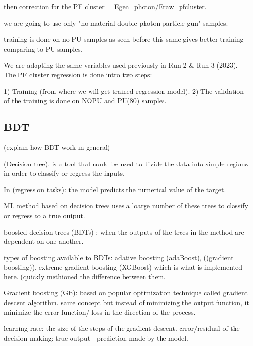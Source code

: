 then correction for the PF cluster = Egen_photon/Eraw_pfcluster.

we are going to use only "no material double photon particle gun" samples.


training is done on no PU samples as seen before this same gives better training comparing to PU samples. 


We are adopting the same variables used previously in Run 2 & Run 3 (2023). The PF cluster regression is done intro two steps:

1) Training (from where we will get trained regression model).
2) The validation of the training is done on NOPU and PU(80) samples.


\subsection{BDT}
(explain how BDT work in general)

(Decision tree): is a tool that could be used to divide the data into simple regions in order to classify or regress the inputs.

In (regression tasks): the model predicts the numerical value of the target.

ML method based on decision trees uses a loarge number of these trees to classify or regress to a true output.

boosted decision trees (BDTs) : when the outputs of the trees in the method are dependent on one another.

types of boosting available to BDTs: adative boosting (adaBoost), ((gradient boosting)), extreme gradient boosting (XGBoost) which is what is implemented here. 
(quickly methioned the difference between them. 

Gradient boosting (GB): based on popular optimization technique called gradient descent algorithm.
same concept but instead of minimizing the output function, it minimize the error function/ loss in the direction of the process.

learning rate: the size of the steps of the gradient descent.
error/residual of the decision making: true output - prediction made by the model.


